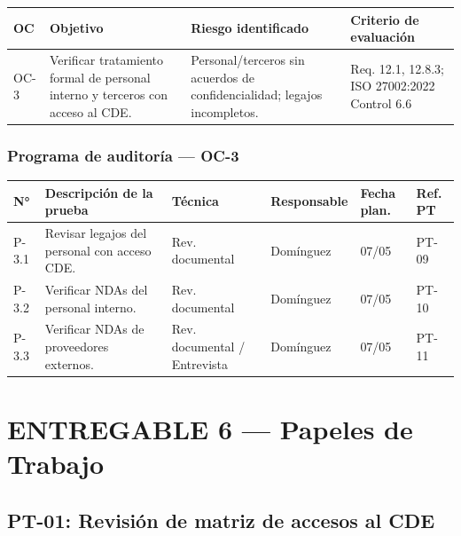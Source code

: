\documentclass[11pt,a4paper]{article}
\begin{document}
\begin{tabularx}{\textwidth}{P{2.5cm}P{3cm}P{2.5cm}L}
\toprule
\textbf{OC} & \textbf{Objetivo} & \textbf{Riesgo identificado} & \textbf{Criterio de evaluación} \\
\midrule
OC-3 & Verificar tratamiento formal de personal interno y terceros con acceso al CDE. & Personal/terceros sin acuerdos de confidencialidad; legajos incompletos. & Req. 12.1, 12.8.3; ISO 27002:2022 Control 6.6 \\
\bottomrule
\end{tabularx}

\subsubsection{Programa de auditoría — OC-3}

\begin{tabularx}{\textwidth}{P{1.8cm}P{2cm}P{3cm}P{2cm}P{1.5cm}L}
\toprule
\textbf{N°} & \textbf{Descripción de la prueba} & \textbf{Técnica} & \textbf{Responsable} & \textbf{Fecha plan.} & \textbf{Ref. PT} \\
\midrule
P-3.1 & Revisar legajos del personal con acceso CDE. & Rev. documental & Domínguez & 07/05 & PT-09 \\
P-3.2 & Verificar NDAs del personal interno. & Rev. documental & Domínguez & 07/05 & PT-10 \\
P-3.3 & Verificar NDAs de proveedores externos. & Rev. documental / Entrevista & Domínguez & 07/05 & PT-11 \\
\bottomrule
\end{tabularx}

\clearpage

\section{ENTREGABLE 6 — Papeles de Trabajo}

\subsection{PT-01: Revisión de matriz de accesos al CDE}
\end{document}

